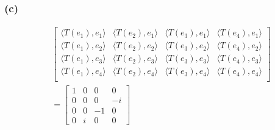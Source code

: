 \documentclass{article}
\begin{document}
\subsubsection*{(c)}
\begin{equation*}
    \begin{split}
        &
        \begin{bmatrix}
            \langle T(e_1), e_1\rangle & \langle T(e_2), e_1\rangle & \langle T(e_3), e_1\rangle & \langle T(e_4), e_1\rangle\\ 
            \langle T(e_1), e_2\rangle & \langle T(e_2), e_2\rangle & \langle T(e_3), e_2\rangle & \langle T(e_4), e_2\rangle\\ 
            \langle T(e_1), e_3\rangle & \langle T(e_2), e_3\rangle & \langle T(e_3), e_3\rangle & \langle T(e_4), e_3\rangle\\ 
            \langle T(e_1), e_4\rangle & \langle T(e_2), e_4\rangle & \langle T(e_3), e_4\rangle & \langle T(e_4), e_4\rangle\\
        \end{bmatrix} \\
        & =
        \begin{bmatrix}
            1 & 0 & 0 & 0 \\
            0 & 0 & 0 & -i \\ 
            0 & 0 & -1 & 0 \\
            0 & i & 0 & 0 
        \end{bmatrix}
    \end{split}
\end{equation*}
\end{document}
